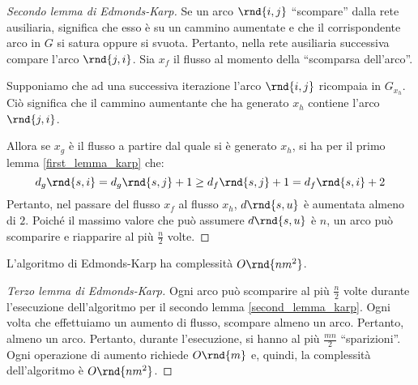 \documentclass[\main/main.tex]{subfiles}
\begin{document}
\begin{proof}[Secondo lemma di Edmonds-Karp]
  Se un arco \(\rnd{i, j}\) ``scompare'' dalla rete ausiliaria, significa che esso è su un cammino aumentate e che il corrispondente arco in \(G\) si satura oppure si svuota. Pertanto, nella rete ausiliaria successiva compare l'arco \(\rnd{j, i}\). Sia \(x_f\) il flusso al momento della ``scomparsa dell'arco''.

  Supponiamo che ad una successiva iterazione l'arco \(\rnd{i, j}\) ricompaia in \(G_{x_h}\). Ciò significa che il cammino aumentante che ha generato \(x_h\) contiene l'arco \(\rnd{j, i}\).

  Allora se \(x_g\) è il flusso a partire dal quale si è generato \(x_h\), si ha per il primo lemma \ref{first_lemma_karp} che:
  \[
    d_g\rnd{s, i} = d_g\rnd{s, j} + 1 \geq d_f\rnd{s, j} + 1 = d_f\rnd{s, i} + 2
  \]
  Pertanto, nel passare del flusso \(x_f\) al flusso \(x_h\), \(d\rnd{s, u}\) è aumentata almeno di \(2\). Poiché il massimo valore che può assumere \(d\rnd{s, u}\) è \(n\), un arco può scomparire e riapparire al più \(\frac{n}{2}\) volte.
\end{proof}
\begin{lemma}
  L'algoritmo di Edmonds-Karp ha complessità \(O\rnd{nm^2}\).
\end{lemma}
\begin{proof}[Terzo lemma di Edmonds-Karp]
  Ogni arco può scomparire al più \(\frac{n}{2}\) volte durante l'esecuzione dell'algoritmo per il secondo lemma \ref{second_lemma_karp}. Ogni volta che effettuiamo un aumento di flusso, scompare almeno un arco. Pertanto, almeno un arco. Pertanto, durante l'esecuzione, si hanno al più \(\frac{mn}{2}\) ``sparizioni''. Ogni operazione di aumento richiede \(O\rnd{m}\) e, quindi, la complessità dell'algoritmo è \(O\rnd{nm^2}\).
\end{proof}
\end{document}
